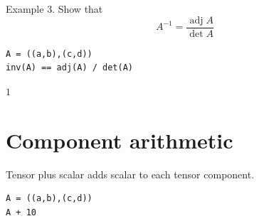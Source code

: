 \documentclass[12pt]{article}
\begin{document}
\bigskip

Example 3. Show that
\begin{equation*}
A^{-1}=\frac{\operatorname{adj}A}{\operatorname{det}A}
\end{equation*}

{\color{blue}
\begin{verbatim}
A = ((a,b),(c,d))
inv(A) == adj(A) / det(A)
\end{verbatim}
}

$1$

\newpage

\section{Component arithmetic}

Tensor plus scalar adds scalar to each tensor component.

{\color{blue}
\begin{verbatim}
A = ((a,b),(c,d))
A + 10
\end{verbatim}}
\end{document}
